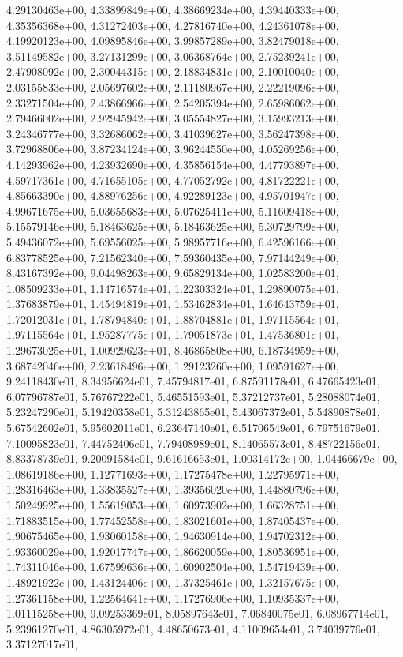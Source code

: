 \documentclass[letterpaper,10pt,english]{sphinxmanual}
\begin{document}
\begin{fulllineitems}
4.29130463e+00, 4.33899849e+00, 4.38669234e+00, 4.39440333e+00, 4.35356368e+00, 4.31272403e+00, 4.27816740e+00, 4.24361078e+00, 4.19920123e+00, 4.09895846e+00, 3.99857289e+00, 3.82479018e+00, 3.51149582e+00, 3.27131299e+00, 3.06368764e+00, 2.75239241e+00, 2.47908092e+00, 2.30044315e+00, 2.18834831e+00, 2.10010040e+00, 2.03155833e+00, 2.05697602e+00, 2.11180967e+00, 2.22219096e+00, 2.33271504e+00, 2.43866966e+00, 2.54205394e+00, 2.65986062e+00, 2.79466002e+00, 2.92945942e+00, 3.05554827e+00, 3.15993213e+00, 3.24346777e+00, 3.32686062e+00, 3.41039627e+00, 3.56247398e+00, 3.72968806e+00, 3.87234124e+00, 3.96244550e+00, 4.05269256e+00, 4.14293962e+00, 4.23932690e+00, 4.35856154e+00, 4.47793897e+00, 4.59717361e+00, 4.71655105e+00, 4.77052792e+00, 4.81722221e+00, 4.85663390e+00, 4.88976256e+00, 4.92289123e+00, 4.95701947e+00, 4.99671675e+00, 5.03655683e+00, 5.07625411e+00, 5.11609418e+00, 5.15579146e+00, 5.18463625e+00, 5.18463625e+00, 5.30729799e+00, 5.49436072e+00, 5.69556025e+00, 5.98957716e+00, 6.42596166e+00, 6.83778525e+00, 7.21562340e+00, 7.59360435e+00, 7.97144249e+00, 8.43167392e+00, 9.04498263e+00, 9.65829134e+00, 1.02583200e+01, 1.08509233e+01, 1.14716574e+01, 1.22303324e+01, 1.29890075e+01, 1.37683879e+01, 1.45494819e+01, 1.53462834e+01, 1.64643759e+01, 1.72012031e+01, 1.78794840e+01, 1.88704881e+01, 1.97115564e+01, 1.97115564e+01, 1.95287775e+01, 1.79051873e+01, 1.47536801e+01, 1.29673025e+01, 1.00929623e+01, 8.46865808e+00, 6.18734959e+00, 3.68742046e+00, 2.23618496e+00, 1.29123260e+00, 1.09591627e+00, 9.24118430e\sphinxhyphen{}01, 8.34956624e\sphinxhyphen{}01, 7.45794817e\sphinxhyphen{}01, 6.87591178e\sphinxhyphen{}01, 6.47665423e\sphinxhyphen{}01, 6.07796787e\sphinxhyphen{}01, 5.76767222e\sphinxhyphen{}01, 5.46551593e\sphinxhyphen{}01, 5.37212737e\sphinxhyphen{}01, 5.28088074e\sphinxhyphen{}01, 5.23247290e\sphinxhyphen{}01, 5.19420358e\sphinxhyphen{}01, 5.31243865e\sphinxhyphen{}01, 5.43067372e\sphinxhyphen{}01, 5.54890878e\sphinxhyphen{}01, 5.67542602e\sphinxhyphen{}01, 5.95602011e\sphinxhyphen{}01, 6.23647140e\sphinxhyphen{}01, 6.51706549e\sphinxhyphen{}01, 6.79751679e\sphinxhyphen{}01, 7.10095823e\sphinxhyphen{}01, 7.44752406e\sphinxhyphen{}01, 7.79408989e\sphinxhyphen{}01, 8.14065573e\sphinxhyphen{}01, 8.48722156e\sphinxhyphen{}01, 8.83378739e\sphinxhyphen{}01, 9.20091584e\sphinxhyphen{}01, 9.61616653e\sphinxhyphen{}01, 1.00314172e+00, 1.04466679e+00, 1.08619186e+00, 1.12771693e+00, 1.17275478e+00, 1.22795971e+00, 1.28316463e+00, 1.33835527e+00, 1.39356020e+00, 1.44880796e+00, 1.50249925e+00, 1.55619053e+00, 1.60973902e+00, 1.66328751e+00, 1.71883515e+00, 1.77452558e+00, 1.83021601e+00, 1.87405437e+00, 1.90675465e+00, 1.93060158e+00, 1.94630914e+00, 1.94702312e+00, 1.93360029e+00, 1.92017747e+00, 1.86620059e+00, 1.80536951e+00, 1.74311046e+00, 1.67599636e+00, 1.60902504e+00, 1.54719439e+00, 1.48921922e+00, 1.43124406e+00, 1.37325461e+00, 1.32157675e+00, 1.27361158e+00, 1.22564641e+00, 1.17276906e+00, 1.10935337e+00, 1.01115258e+00, 9.09253369e\sphinxhyphen{}01, 8.05897643e\sphinxhyphen{}01, 7.06840075e\sphinxhyphen{}01, 6.08967714e\sphinxhyphen{}01, 5.23961270e\sphinxhyphen{}01, 4.86305972e\sphinxhyphen{}01, 4.48650673e\sphinxhyphen{}01, 4.11009654e\sphinxhyphen{}01, 3.74039776e\sphinxhyphen{}01, 3.37127017e\sphinxhyphen{}01, 
\end{fulllineitems}
\end{document}
